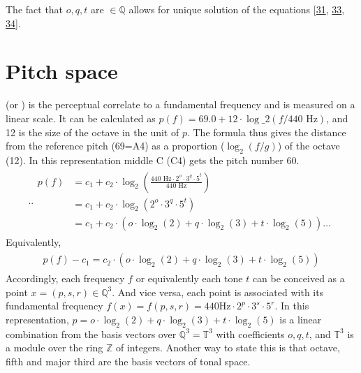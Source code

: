 \documentclass[letterpaper,10pt,english]{sphinxmanual}
\begin{document}
\sphinxAtStartPar
The fact that \(o, q, t\) are \(\in \mathbb Q\) allows for
unique solution of the equations
{[}\hyperlink{cite.8_bibliography:id48}{31}, \hyperlink{cite.8_bibliography:id47}{33}, \hyperlink{cite.8_bibliography:id4}{34}{]}.


\section{Pitch space}
\label{\detokenize{5_notes:pitch-space}}
\sphinxAtStartPar
{} (or ) is the perceptual correlate to a fundamental
frequency and is measured on a linear scale. It can be calculated as
\(p(f) = 69.0 + 12 \cdot \log\_2(f/440 \text{ Hz}) \), and 12 is the
size of the octave in the unit of \(p\). The formula thus gives the
distance from the reference pitch (69=A4) as a proportion
(\(\log_2(f/g)\)) of the octave (12). In this representation middle
C (C4) gets the pitch number 60.
\begin{equation*}
\begin{split}.. \begin{aligned}
 p(f) & = c_1+c_2\cdot \log_2\left(\frac{440 \text{ Hz}\cdot 2^o \cdot 3^q \cdot 5^t}{440\text{ Hz}}\right)\\
      & = c_1+c_2\cdot \log_2\left(2^o\cdot3^q\cdot5^t\right) \\
            & = c_1+c_2 \cdot (o\cdot\log_2(2) + q\cdot \log_2(3) + t\cdot\log_2(5) ).
.. \end{aligned}\end{split}
\end{equation*}
\sphinxAtStartPar
Equivalently,
\begin{equation*}
\begin{split}\begin{aligned}
  p(f)- c_1 = c_2 \cdot (o\cdot\log_2(2) + q\cdot \log_2(3) + t\cdot\log_2(5) )\end{aligned}\end{split}
\end{equation*}
\sphinxAtStartPar
Accordingly, each frequency \(f\) or equivalently each tone
\(t\) can be conceived as a point
\(x = (p, s, r) \in \mathbb Q^3\). And vice versa, each point is
associated with its fundamental frequency
\(f(x) = f(p, s, r) = 440 \text{Hz} \cdot 2^p \cdot 3^s \cdot 5^r\).
In this representation,
\(p = o \cdot \log_2(2) + q\cdot \log_2(3) + t\cdot \log_2(5)\) is a
linear combination from the basis vectors over
\(\mathbb Q^3 = \mathbb T^3\) with coefficients \(o, q, t\), and
\(\mathbb T^3\) is a module over the ring \(\mathbb Z\) of
integers. Another way to state this is that octave, fifth and major
third are the basis vectors of tonal space.
\end{document}
